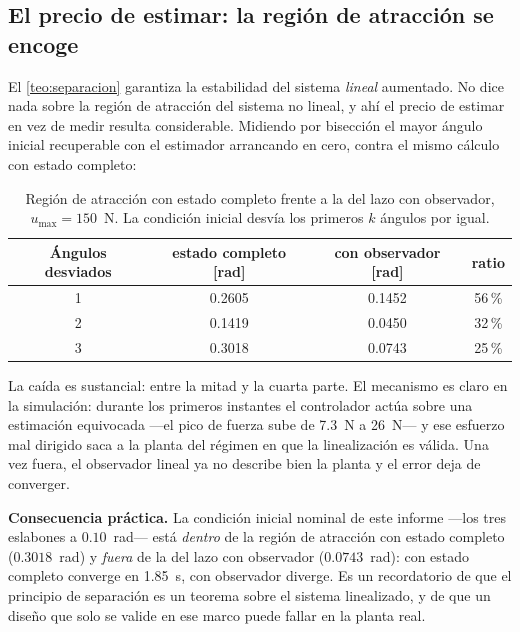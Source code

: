 \documentclass[11pt,letterpaper]{article}
\theoremstyle{definition}
\theoremstyle{plain}
\theoremstyle{remark}
\begin{document}
\subsection{El precio de estimar: la región de atracción se encoge}
\label{sec:precioestimar}

El \cref{teo:separacion} garantiza la estabilidad del sistema \emph{lineal}
aumentado. No dice nada sobre la región de atracción del sistema no lineal, y
ahí el precio de estimar en vez de medir resulta considerable. Midiendo por
bisección el mayor ángulo inicial recuperable con el estimador arrancando en
cero, contra el mismo cálculo con estado completo:

\begin{table}[htbp]
  \centering\small
  \caption{Región de atracción con estado completo frente a la del lazo con
  observador, $u_{\max}=150$~N. La condición inicial desvía los primeros
  $k$ ángulos por igual.}
  \label{tab:roaobs}
  \begin{tabular}{@{}cccc@{}}
    \toprule
    \textbf{Ángulos desviados} & \textbf{estado completo} [rad] & \textbf{con observador} [rad] & \textbf{ratio}\\
    \midrule
    1 & 0.2605 & 0.1452 & 56\,\%\\
    2 & 0.1419 & 0.0450 & 32\,\%\\
    3 & 0.3018 & 0.0743 & 25\,\%\\
    \bottomrule
  \end{tabular}
\end{table}

La caída es sustancial: entre la mitad y la cuarta parte. El mecanismo es claro
en la simulación: durante los primeros instantes el controlador actúa sobre una
estimación equivocada ---el pico de fuerza sube de 7.3~N a 26~N--- y ese esfuerzo
mal dirigido saca a la planta del régimen en que la linealización es válida. Una
vez fuera, el observador lineal ya no describe bien la planta y el error deja de
converger.

\begin{alerta}
\small
\textbf{Consecuencia práctica.} La condición inicial nominal de este informe
---los tres eslabones a $0.10$~rad--- está \emph{dentro} de la región de
atracción con estado completo ($0.3018$~rad) y \emph{fuera} de la del lazo con
observador ($0.0743$~rad): con estado completo converge en 1.85~s, con
observador diverge. Es un recordatorio de que el principio de separación es un
teorema sobre el sistema linealizado, y de que un diseño que solo se valide en
ese marco puede fallar en la planta real.
\end{alerta}
\end{document}
